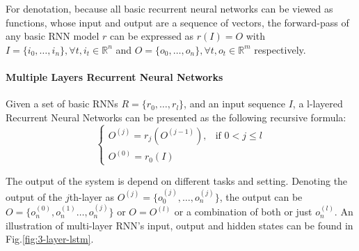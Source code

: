 For denotation, because all basic recurrent neural networks can be viewed as functions, whose input and output are a sequence of vectors, the forward-pass of any basic RNN model \(r\) can be expressed as \(r(I) = O\) with \(I = \{i_0,\ldots,i_n\}, \forall t, i_t \in \mathbb{R}^n\) and \(O = \{o_0,\ldots,o_n\}, \forall t, o_t \in \mathbb{R}^m\) respectively. 

\paragraph{Multiple Layers Recurrent Neural Networks}\label{sec:multilayer-lstm}
Given a set of basic RNNs \(R = \{r_0,\ldots,r_l\}\), and an input sequence \(I\), a l-layered Recurrent Neural Networks can be presented as the following recursive formula:
\begin{equation}
	\begin{cases}
	O^{(j)} = r_j(O^{(j-1)}), & \mbox{if }  0 < j \leq l\\
	O^{(0)} = r_0(I) 
	\end{cases}
\end{equation}

The output of the system is depend on different tasks and setting. 
Denoting the output of the \(j\)th-layer as  \(O^{(j)} = \{o^{(j)}_0,\ldots,o^{(j)}_n\}\), the output can be \(O= \{o^{(0)}_n, o^{(1)}_n\ldots,o^{(j)}_n\}\)\cite{treeLSTM} or \(O = O^{(l)}\) or a combination of both or just \(o^{(l)}_n\). 
An illustration of multi-layer RNN's input, output and hidden states can be found in Fig.\ref{fig:3-layer-lstm}.

